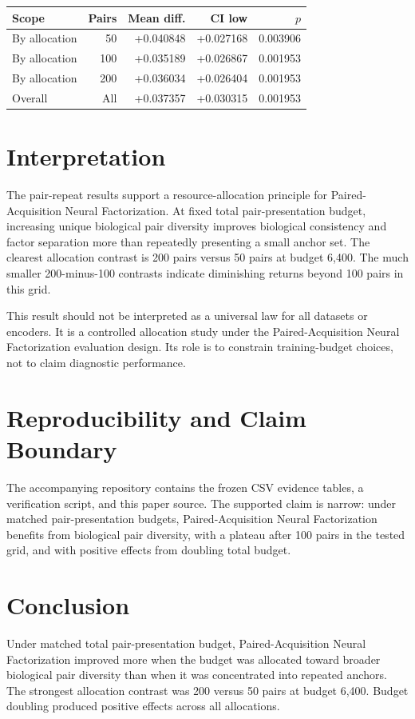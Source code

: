 ﻿\documentclass[10pt]{article}
\begin{document}
\begin{center}
\begin{minipage}{0.78\linewidth}
\centering
{}
\label{tab:doubling}
\small
\begin{tabular}{lrrrr}
\toprule
Scope & Pairs & Mean diff. & CI low & $p$ \\
\midrule
By allocation & 50 & +0.040848 & +0.027168 & 0.003906 \\
By allocation & 100 & +0.035189 & +0.026867 & 0.001953 \\
By allocation & 200 & +0.036034 & +0.026404 & 0.001953 \\
Overall & All & +0.037357 & +0.030315 & 0.001953 \\
\bottomrule
\end{tabular}
\end{minipage}
\end{center}

\section{Interpretation}

The pair-repeat results support a resource-allocation principle for Paired-Acquisition Neural Factorization. At fixed total pair-presentation budget, increasing unique biological pair diversity improves biological consistency and factor separation more than repeatedly presenting a small anchor set. The clearest allocation contrast is 200 pairs versus 50 pairs at budget 6,400. The much smaller 200-minus-100 contrasts indicate diminishing returns beyond 100 pairs in this grid.

This result should not be interpreted as a universal law for all datasets or encoders. It is a controlled allocation study under the Paired-Acquisition Neural Factorization evaluation design. Its role is to constrain training-budget choices, not to claim diagnostic performance.

\section{Reproducibility and Claim Boundary}

The accompanying repository contains the frozen CSV evidence tables, a verification script, and this paper source. The supported claim is narrow: under matched pair-presentation budgets, Paired-Acquisition Neural Factorization benefits from biological pair diversity, with a plateau after 100 pairs in the tested grid, and with positive effects from doubling total budget.

\section{Conclusion}

Under matched total pair-presentation budget, Paired-Acquisition Neural Factorization improved more when the budget was allocated toward broader biological pair diversity than when it was concentrated into repeated anchors. The strongest allocation contrast was 200 versus 50 pairs at budget 6,400. Budget doubling produced positive effects across all allocations.
\end{document}
